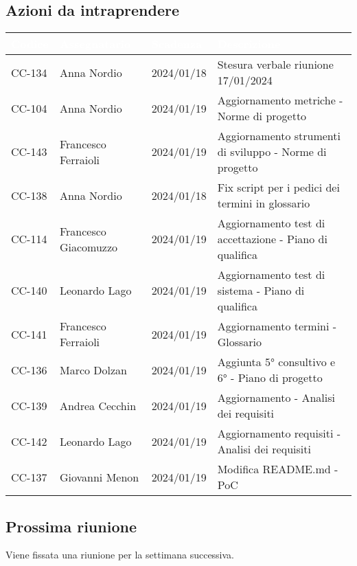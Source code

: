 \subsection{Azioni da intraprendere}
{
    \setlength{\tabcolsep}{10pt}
            \renewcommand{\arraystretch}{1.5}
            \begin{xltabular}{\textwidth}{| l | l | l | X |}
                 \hline
                 \textbf{\textcolor{white}{Codice }} & \textbf{\textcolor{white}{Assegnatario}} & \textbf{\textcolor{white}{Scadenza}} & \textbf{\textcolor{white}{Descrizione}} \\
                 \hline
                 CC-134 & Anna Nordio & 2024/01/18 & Stesura verbale riunione 17/01/2024 \\
                 \hline
                 CC-104 & Anna Nordio & 2024/01/19 & Aggiornamento metriche - Norme di progetto\\
                 \hline
                 CC-143 & Francesco Ferraioli & 2024/01/19 & Aggiornamento strumenti di sviluppo - Norme di progetto\\
                 \hline
                 CC-138 & Anna Nordio & 2024/01/18 & Fix script per i pedici dei termini in glossario \\
                 \hline
                 CC-114 & Francesco Giacomuzzo & 2024/01/19 & Aggiornamento test di accettazione - Piano di qualifica \\
                 \hline
                 CC-140 & Leonardo Lago & 2024/01/19 & Aggiornamento test di sistema - Piano di qualifica \\
                 \hline
                 CC-141 & Francesco Ferraioli & 2024/01/19 & Aggiornamento termini - Glossario \\
                 \hline
                 CC-136 & Marco Dolzan & 2024/01/19 & Aggiunta 5° consultivo e 6°  - Piano di progetto \\
                 \hline
                 CC-139 & Andrea Cecchin & 2024/01/19 & Aggiornamento  - Analisi dei requisiti \\
                 \hline
                 CC-142 & Leonardo Lago & 2024/01/19 & Aggiornamento requisiti - Analisi dei requisiti \\
                 \hline
                 CC-137 & Giovanni Menon & 2024/01/19 & Modifica README.md - PoC \\
                 \hline
            \end{xltabular}
}


\subsection{Prossima riunione} \label{subsec:riunione}
Viene fissata una riunione per la settimana successiva.
